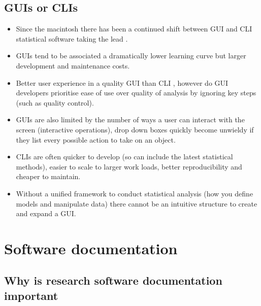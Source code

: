 \documentclass{SBCbookchapter}
\begin{document}



\subsection{GUIs or CLIs}

\begin{itemize}
    \item Since the macintosh there has been a continued shift between GUI and CLI statistical software taking the lead \cite{ValeroMora2012}. 
    \item GUIs tend to be associated a dramatically lower learning curve but larger development and maintenance costs.
    \item Better user experience in a quality GUI than CLI \cite{Staggers2000}, however do GUI developers prioritise ease of use over quality of analysis by ignoring key steps (such as quality control).
    \item GUIs are also limited by the number of ways a user can interact with the screen (interactive operations), drop down boxes quickly become unwieldy if they list every possible action to take on an object. 
    \item CLIs are often quicker to develop (so can include the latest statistical methods), easier to scale to larger work loads, better reproducibility and cheaper to maintain.
    \item Without a unified framework to conduct statistical analysis (how you define models and manipulate data) there cannot be an intuitive structure to create and expand a GUI. \cite{Unwin2012}

\end{itemize}

\section{Software documentation}

\subsection{Why is research software documentation important}
\end{document}
